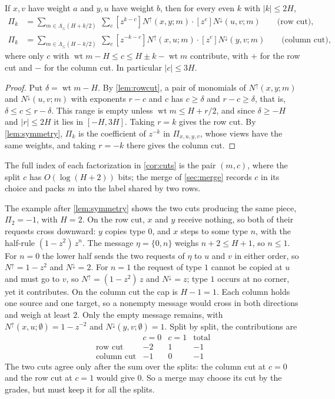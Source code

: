\documentclass[11pt]{article}
\theoremstyle{definition}
\theoremstyle{definition}
\theoremstyle{remark}
\newcommand{\wt}{\operatorname{wt}}
\newcommand{\Nup}{N^{\uparrow}}
\newcommand{\Ndown}{N^{\downarrow}}
\begin{document}
\begin{corollary}\label{cor:cuts}
If $x,v$ have weight $a$ and $y,u$ have weight $b$, then for every even $k$ with $|k|\le2H$,
\begin{align*}
\Pi_k&=\sum_{m\in\Lambda_{\le}(H+k/2)}\ \sum_c[z^{k-c}]\Nup(x,y;m)\cdot[z^c]\Ndown(u,v;m)\qquad\text{(row cut)},\\
\Pi_k&=\sum_{m\in\Lambda_{\le}(H-k/2)}\ \sum_c[z^{-k-c}]\Nup(x,u;m)\cdot[z^c]\Ndown(y,v;m)\qquad\text{(column cut)},
\end{align*}
where only $c$ with $\wt m-H\le c\le H\pm k-\wt m$ contribute, with $+$ for the row cut and $-$ for the column cut. In particular $|c|\le3H$.
\end{corollary}

\begin{proof}
Put $\delta=\wt m-H$. By \cref{lem:rowcut}, a pair of monomials of $\Nup(x,y;m)$ and $\Ndown(u,v;m)$ with exponents $r-c$ and $c$ has $c\ge\delta$ and $r-c\ge\delta$, that is, $\delta\le c\le r-\delta$. This range is empty unless $\wt m\le H+r/2$, and since $\delta\ge-H$ and $|r|\le2H$ it lies in $[-H,3H]$. Taking $r=k$ gives the row cut. By \cref{lem:symmetry}, $\Pi_k$ is the coefficient of $z^{-k}$ in $\Pi_{x,u,y,v}$, whose views have the same weights, and taking $r=-k$ there gives the column cut.
\end{proof}

The full index of each factorization in \cref{cor:cuts} is the pair $(m,c)$, where the split $c$ has $O(\log(H+2))$ bits; the merge of \cref{sec:merge} records $c$ in its choice and packs $m$ into the label shared by two rows.

The example after \cref{lem:symmetry} shows the two cuts producing the same piece, $\Pi_2=-1$, with $H=2$. On the row cut, $x$ and $y$ receive nothing, so both of their requests cross downward: $y$ copies type $0$, and $x$ steps to some type $n$, with the half-rule $(1-z^2)\,z^n$. The message $\eta=\{0,n\}$ weighs $n+2\le H+1$, so $n\le1$. For $n=0$ the lower half sends the two requests of $\eta$ to $u$ and $v$ in either order, so $\Nup=1-z^2$ and $\Ndown=2$. For $n=1$ the request of type $1$ cannot be copied at $u$ and must go to $v$, so $\Nup=(1-z^2)\,z$ and $\Ndown=z$; type $1$ occurs at no corner, yet it contributes. On the column cut the cap is $H-1=1$. Each column holds one source and one target, so a nonempty message would cross in both directions and weigh at least $2$. Only the empty message remains, with $\Nup(x,u;\emptyset)=1-z^{-2}$ and $\Ndown(y,v;\emptyset)=1$. Split by split, the contributions are
\[
\begin{array}{lrrr}
&c=0&c=1&\text{total}\\
\text{row cut}&-2&1&-1\\
\text{column cut}&-1&0&-1
\end{array}
\]
The two cuts agree only after the sum over the splits: the column cut at $c=0$ and the row cut at $c=1$ would give $0$. So a merge may choose its cut by the grades, but must keep it for all the splits.
\end{document}
